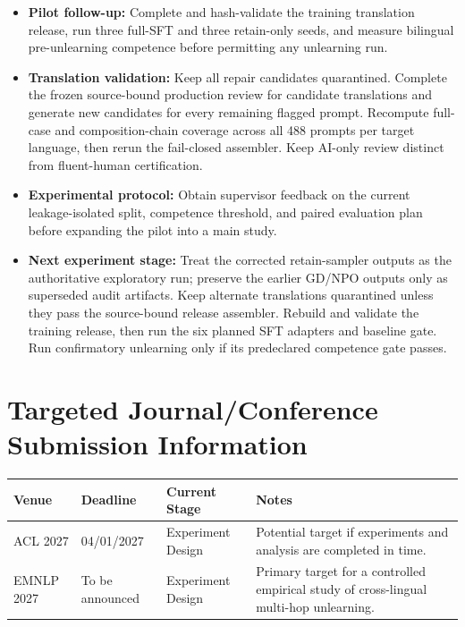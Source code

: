 \documentclass[10pt,a4paper]{article}
\begin{document}
\begin{itemize}[label=$\square$]

    \item \textbf{Pilot follow-up:}
    Complete and hash-validate the training translation
    release, run three full-SFT and three retain-only seeds,
    and measure bilingual pre-unlearning competence before
    permitting any unlearning run.

    \item \textbf{Translation validation:}
    Keep all repair candidates quarantined. Complete the frozen
    source-bound production review for candidate translations and
    generate new candidates for every remaining flagged prompt. Recompute
    full-case and composition-chain coverage across all 488 prompts per
    target language, then rerun the fail-closed assembler. Keep AI-only
    review distinct from fluent-human certification.

    \item \textbf{Experimental protocol:}
    Obtain supervisor feedback on the current
    leakage-isolated split, competence threshold,
    and paired evaluation plan before expanding
    the pilot into a main study.

    \item \textbf{Next experiment stage:}
    Treat the corrected retain-sampler outputs as the
    authoritative exploratory run; preserve the earlier
    GD/NPO outputs only as superseded audit artifacts.
    Keep alternate translations quarantined unless they pass the
    source-bound release assembler. Rebuild and validate the training
    release, then run the six planned SFT adapters and baseline gate.
    Run confirmatory unlearning only if its predeclared competence
    gate passes.

\end{itemize}

\section{Targeted Journal/Conference Submission Information}

\begin{tabularx}{\textwidth}{@{}p{2.7cm}p{2.9cm}p{2.8cm}X@{}}
\toprule
\textbf{Venue} & \textbf{Deadline} &
\textbf{Current Stage} & \textbf{Notes}\\
\midrule

ACL 2027 &
04/01/2027 &
Experiment Design &
Potential target if experiments and analysis
are completed in time.\\

\midrule

EMNLP 2027 &
To be announced &
Experiment Design &
Primary target for a controlled empirical
study of cross-lingual multi-hop unlearning.\\

\bottomrule
\end{tabularx}
\end{document}

